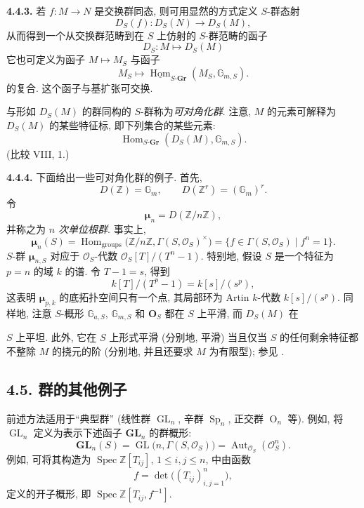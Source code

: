 \medskip
\noindent{}\textbf{4.4.3.}
若 \(f:M\to N\) 是交换群同态, 则可用显然的方式定义 \(S\)-群态射
\[
  D_S(f):D_S(N)\longrightarrow D_S(M),
\]
从而得到一个从交换群范畴到在 \(S\) 上仿射的 \(S\)-群范畴的函子
\[
  D_S:M\longmapsto D_S(M)
\]
它也可定义为函子 \(M\mapsto M_S\) 与函子
\[
  M_S\longmapsto
  \underline{\operatorname{Hom}}_{S\text{-}\mathbf{Gr}}
    (M_S,\mathbb G_{m,S}).
\]
的复合. 这个函子与基扩张可交换.

与形如 \(D_S(M)\) 的群同构的 \(S\)-群称为\emph{可对角化群}.
注意, \(M\) 的元素可解释为 \(D_S(M)\) 的某些特征标,
即下列集合的某些元素:
\[
  \operatorname{Hom}_{S\text{-}\mathbf{Gr}}
    (D_S(M),\mathbb G_{m,S}).
\]
(比较 VIII, 1.)

\medskip
\noindent{}\textbf{4.4.4.}
下面给出一些可对角化群的例子. 首先,
\[
  D(\mathbb Z)=\mathbb G_m,
  \qquad
  D(\mathbb Z^r)=(\mathbb G_m)^r.
\]
令
\[
  \boldsymbol\mu_n=D(\mathbb Z/n\mathbb Z),
\]
并称之为 \emph{\(n\) 次单位根群}. 事实上,
\[
  \boldsymbol\mu_n(S)
    =\operatorname{Hom}_{\mathrm{groups}}
       \bigl(\mathbb Z/n\mathbb Z,\Gamma(S,\mathcal O_S)^{\times}\bigr)
    =\{f\in\Gamma(S,\mathcal O_S)\mid f^n=1\}.
\]
\(S\)-群 \(\boldsymbol\mu_{n,S}\) 对应于 \(\mathcal O_S\)-代数
\(\mathcal O_S[T]/(T^n-1)\). 特别地, 假设 \(S\) 是一个特征为
\(p=n\) 的域 \(k\) 的谱. 令 \(T-1=s\), 得到
\[
  k[T]/(T^p-1)=k[s]/(s^p),
\]
这表明 \(\boldsymbol\mu_{p,k}\) 的底拓扑空间只有一个点,
其局部环为 Artin \(k\)-代数 \(k[s]/(s^p)\). 同样地, 注意
\(S\)-概形 \(\mathbb G_{a,S}\), \(\mathbb G_{m,S}\) 和
\(\mathbf O_S\) 都在 \(S\) 上平滑, 而 \(D_S(M)\) 在

\(S\) 上平坦. 此外, 它在 \(S\) 上形式平滑 (分别地, 平滑)
当且仅当 \(S\) 的任何剩余特征都不整除 \(M\) 的挠元的阶
(分别地, 并且还要求 \(M\) 为有限型); 参见
.

\subsection*{4.5. 群的其他例子}

前述方法适用于``典型群'' (线性群 \(\operatorname{GL}_n\), 辛群
\(\operatorname{Sp}_n\), 正交群 \(\operatorname O_n\) 等).
例如, 将 \(\operatorname{GL}_n\) 定义为表示下述函子
\(\mathbf{GL}_n\) 的群概形:
\[
  \mathbf{GL}_n(S)
    =\operatorname{GL}\bigl(n,\Gamma(S,\mathcal O_S)\bigr)
    =\operatorname{Aut}_{\mathcal O_S}(\mathcal O_S^n).
\]
例如, 可将其构造为 \(\operatorname{Spec}\mathbb Z[T_{ij}]\),
\(1\leq i,j\leq n\), 中由函数
\[
  f=\det\bigl((T_{ij})_{i,j=1}^n\bigr),
\]
定义的开子概形, 即 \(\operatorname{Spec}\mathbb Z[T_{ij},f^{-1}]\).

